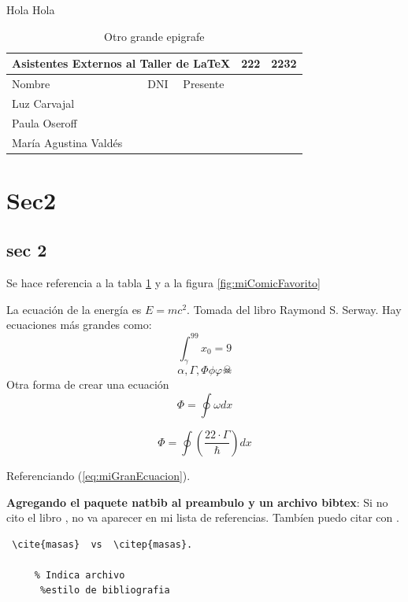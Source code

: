 \documentclass[titlepage]{article}
\begin{document}
\vspace{5mm}
Hola Hola 


\begin{table}[h!]
\centering
\caption{Otro grande epigrafe}

\begin{tabular}{|l|l|l|l|l|}
\hline
\multicolumn{3}{|l|}{Asistentes Externos al Taller de LaTeX} & 222 & 2232 \\ \hline
Nombre                        & DNI        & Presente        &     &      \\ \hline
Luz Carvajal                  &            &                 &     &      \\ \hline
Paula Oseroff                 &            &                 &     &      \\ \hline
María Agustina Valdés         &            &                 &     &      \\ \hline
\end{tabular}
\label{tab:asistentes}
\end{table}
\section{Sec2}
\subsection{sec 2}
Se hace referencia a la tabla \ref{tab:asistentes} y a la figura \ref{fig:miComicFavorito}


La ecuación de la energía es \( E=mc^2 \). Tomada del libro Raymond S. Serway. Hay ecuaciones más grandes como: 
\[ \int_{\gamma}^{99} x_0 = 9  \]
\[ \alpha, \Gamma ,\Phi \phi \varphi \skull \]
Otra forma de crear una ecuación
\begin{equation}
    \Phi = \oint \omega dx
\end{equation}

\begin{equation*} \label{eq:miGranEcuacion}
    \Phi = \oint \left( \frac{22 \cdot \Gamma}{\hbar} \right) dx
\end{equation*}

Referenciando (\ref{eq:miGranEcuacion}).

\textbf{Agregando el paquete natbib al preambulo y un archivo bibtex}: Si no cito el libro \cite{masas}, no va aparecer en mi lista de referencias. Tambíen puedo citar con \citep{masas}.%



\begin{verbatim}
 \cite{masas}  vs  \citep{masas}.

	 % Indica archivo
	  %estilo de bibliografia
\end{verbatim}
\end{document}
